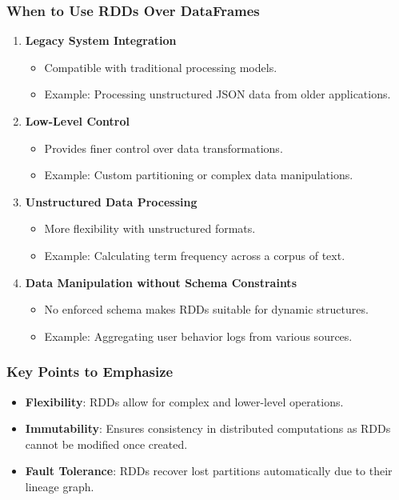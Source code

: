 \documentclass[aspectratio=169]{beamer}
\begin{document}
\begin{frame}[fragile]
    \frametitle{When to Use RDDs Over DataFrames}
    
    \begin{enumerate}
        \item \textbf{Legacy System Integration}
        \begin{itemize}
            \item Compatible with traditional processing models.
            \item Example: Processing unstructured JSON data from older applications.
        \end{itemize}
        
        \item \textbf{Low-Level Control}
        \begin{itemize}
            \item Provides finer control over data transformations.
            \item Example: Custom partitioning or complex data manipulations.
        \end{itemize}
        
        \item \textbf{Unstructured Data Processing}
        \begin{itemize}
            \item More flexibility with unstructured formats.
            \item Example: Calculating term frequency across a corpus of text.
        \end{itemize}
        
        \item \textbf{Data Manipulation without Schema Constraints}
        \begin{itemize}
            \item No enforced schema makes RDDs suitable for dynamic structures.
            \item Example: Aggregating user behavior logs from various sources.
        \end{itemize}
    \end{enumerate}
\end{frame}

\begin{frame}[fragile]
    \frametitle{Key Points to Emphasize}

    \begin{itemize}
        \item \textbf{Flexibility}: RDDs allow for complex and lower-level operations.
        \item \textbf{Immutability}: Ensures consistency in distributed computations as RDDs cannot be modified once created.
        \item \textbf{Fault Tolerance}: RDDs recover lost partitions automatically due to their lineage graph.
    \end{itemize}
\end{frame}
\end{document}
